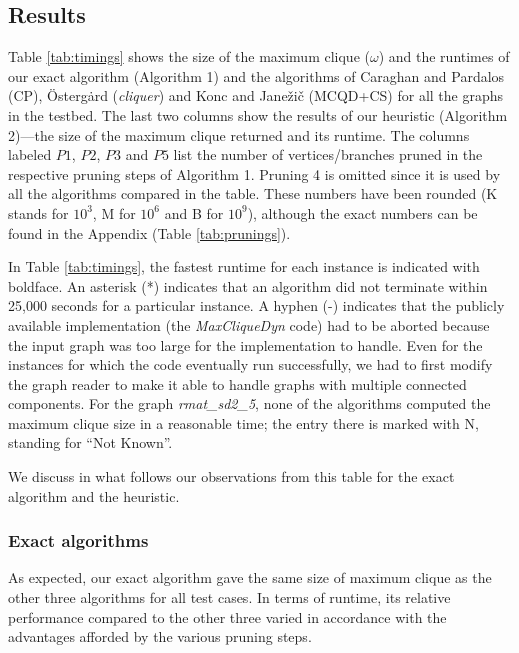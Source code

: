 \subsection{Results}

\label{sec:exp-results}
%




Table \ref{tab:timings} shows the size of the maximum clique ($\omega$) and the runtimes  of our exact algorithm (Algorithm 1) and the algorithms of Caraghan and Pardalos (CP), 
\"{O}sterg\.{a}rd ({\it cliquer}) 
and Konc and Jane\v{z}i\v{c}  (MCQD+CS) for all the graphs in the testbed. 
The last two columns show the results of our heuristic (Algorithm 2)---the size of the maximum clique 
returned  and its runtime. The columns labeled $P1$, $P2$, $P3$ and $P5$ list the number of 
vertices/branches pruned in the respective pruning steps of Algorithm 1.
Pruning 4 is omitted since it is used by all the algorithms compared in the table. These numbers have been rounded  (K stands for $10^3$, M for $10^6$ and B for $10^9$), although the exact numbers can be found in the Appendix (Table \ref{tab:prunings}).

In Table \ref{tab:timings}, the fastest runtime for each instance is indicated with boldface. 
An asterisk (*) indicates that an algorithm did not terminate within 25,000 seconds for a particular
instance. A hyphen (-) indicates that the publicly available implementation 
(the {\it MaxCliqueDyn} code) had to be aborted because the input graph was too large 
for the implementation to handle. Even for the instances for which the code
eventually run successfully, we had to first modify 
the graph reader to make it able to handle graphs with multiple connected components.
For the graph {\it rmat\_sd2\_5}, none of the algorithms computed the maximum clique size in 
a reasonable time; the entry there is marked with N, standing for  ``Not Known''.

We discuss in what follows our observations from this table
for the exact algorithm and the heuristic.

\subsubsection{Exact algorithms}
\label{sec:exp-exact}

As expected, our exact algorithm gave the same size of maximum clique as the other
three algorithms for all test cases. 
In terms of runtime,  its relative performance compared to the other three varied
in accordance with the advantages afforded by the various pruning steps.  


